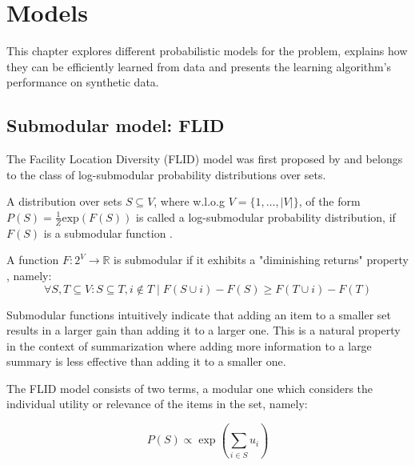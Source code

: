 \chapter{Models}
\label{sec:models}

This chapter explores different probabilistic models for the problem, explains how they can be efficiently learned from data and presents the learning algorithm's performance on synthetic data.

\section{Submodular model: FLID}

The Facility Location Diversity (FLID) model was first proposed by \citet{tschiatschek16learning} and belongs to the class of log-submodular probability distributions over sets.

\begin{definition}
  A distribution over sets $S \subseteq V$, where w.l.o.g $V = \{1,\dots,|V|\}$, of the form $P(S) = \frac{1}{Z}\mathrm{exp}(F(S))$ is called a log-submodular probability distribution, if $F(S)$ is a submodular function \citep{djolonga14variational}.
\end{definition}

\begin{definition}
  \label{def:submodularity}
  A function $F:2^V \rightarrow \mathbb{R}$ is submodular if it exhibits a "diminishing returns" property \citep{krause14submodular}, namely:
    \begin{equation*}
      \forall S,T \subseteq V : S \subseteq T, i \notin T \mid F(S \cup i) - F(S) \geq F(T \cup i) - F(T)
    \end{equation*}
\end{definition}

Submodular functions intuitively indicate that adding an item to a smaller set results in a larger gain than adding it to a larger one. This is a natural property in the context of summarization where adding more information to a large summary is less effective than adding it to a smaller one.

The FLID model consists of two terms, a modular one which considers the individual utility or relevance of the items in the set, namely:

\begin{equation}
  \label{eq:modular}
  P(S) \propto \exp\left(\sum_{i \in S}u_{i}\right)
\end{equation}

